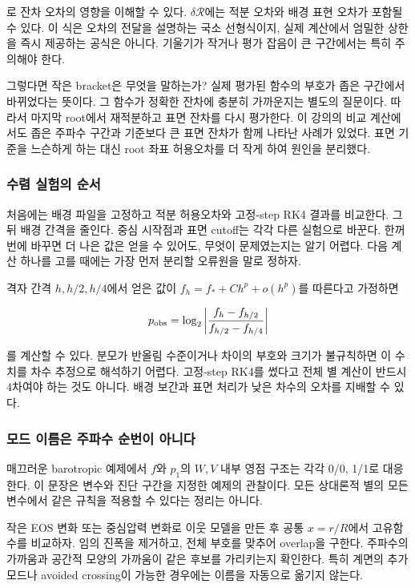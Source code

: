 \documentclass[
  10pt,
  a4paper,
]{article}
\begin{document}
로 잔차 오차의 영향을 이해할 수 있다. \(\delta\mathcal R\)에는 적분
오차와 배경 표현 오차가 포함될 수 있다. 이 식은 오차의 전달을 설명하는
국소 선형식이지, 실제 계산에서 엄밀한 상한을 즉시 제공하는 공식은
아니다. 기울기가 작거나 평가 잡음이 큰 구간에서는 특히 주의해야 한다.

그렇다면 작은 bracket은 무엇을 말하는가? 실제 평가된 함수의 부호가 좁은
구간에서 바뀌었다는 뜻이다. 그 함수가 정확한 잔차에 충분히 가까운지는
별도의 질문이다. 따라서 마지막 root에서 재적분하고 표면 잔차를 다시
평가한다. 이 강의의 비교 계산에서도 좁은 주파수 구간과 기준보다 큰 표면
잔차가 함께 나타난 사례가 있었다. 표면 기준을 느슨하게 하는 대신 root
좌표 허용오차를 더 작게 하여 원인을 분리했다.

\subsubsection{수렴 실험의
순서}\label{uxc218uxb834-uxc2e4uxd5d8uxc758-uxc21cuxc11c}

처음에는 배경 파일을 고정하고 적분 허용오차와 고정-step RK4 결과를
비교한다. 그 뒤 배경 간격을 줄인다. 중심 시작점과 표면 cutoff는 각각
다른 실험으로 바꾼다. 한꺼번에 바꾸면 더 나은 값은 얻을 수 있어도,
무엇이 문제였는지는 알기 어렵다. 다음 계산 하나를 고를 때에는 가장 먼저
분리할 오류원을 말로 정하자.

격자 간격 \(h,h/2,h/4\)에서 얻은 값이 \(f_h=f_*+Ch^p+o(h^p)\)를 따른다고
가정하면

\[
p_{\rm obs}=\log_2\left|\frac{f_h-f_{h/2}}{f_{h/2}-f_{h/4}}\right|
\]

를 계산할 수 있다. 분모가 반올림 수준이거나 차이의 부호와 크기가
불규칙하면 이 수치를 차수 추정으로 해석하기 어렵다. 고정-step RK4를
썼다고 전체 별 계산이 반드시 4차여야 하는 것도 아니다. 배경 보간과 표면
처리가 낮은 차수의 오차를 지배할 수 있다.

\subsubsection{모드 이름은 주파수 순번이
아니다}\label{uxbaa8uxb4dc-uxc774uxb984uxc740-uxc8fcuxd30cuxc218-uxc21cuxbc88uxc774-uxc544uxb2c8uxb2e4}

매끄러운 barotropic 예제에서 \(f\)와 \(p_1\)의 \(W,V\) 내부 영점 구조는
각각 0/0, 1/1로 대응한다. 이 문장은 변수와 진단 구간을 지정한 예제의
관찰이다. 모든 상대론적 별의 모든 변수에서 같은 규칙을 적용할 수 있다는
정리는 아니다.

작은 EOS 변화 또는 중심압력 변화로 이웃 모델을 만든 후 공통
\(x=r/R\)에서 고유함수를 비교하자. 임의 진폭을 제거하고, 전체 부호를
맞추어 overlap을 구한다. 주파수의 가까움과 공간적 모양의 가까움이 같은
후보를 가리키는지 확인한다. 특히 계면의 추가 모드나 avoided crossing이
가능한 경우에는 이름을 자동으로 옮기지 않는다.
\end{document}
